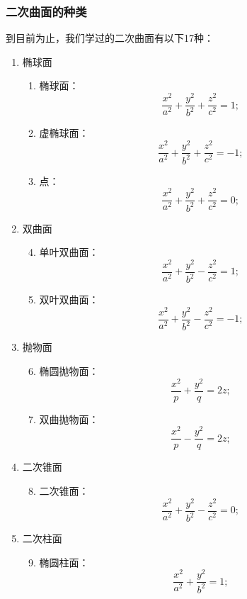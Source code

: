 \subsubsection{二次曲面的种类}
到目前为止，我们学过的二次曲面有以下17种：
\begin{enumerate}[label={\chinese*.}]
	\item 椭球面
	\begin{enumerate}[label={\arabic*.}]
		\item 椭球面：\[
			\frac{x^2}{a^2}+\frac{y^2}{b^2}+\frac{z^2}{c^2}=1;
		\]

		\item 虚椭球面：\[
			\frac{x^2}{a^2}+\frac{y^2}{b^2}+\frac{z^2}{c^2}=-1;
		\]

		\item 点：\[
			\frac{x^2}{a^2}+\frac{y^2}{b^2}+\frac{z^2}{c^2}=0;
		\]
	\end{enumerate}

	\item 双曲面
	\begin{enumerate}[label={\arabic*.}]
		\setcounter{enumii}{3}
		\item 单叶双曲面：\[
			\frac{x^2}{a^2}+\frac{y^2}{b^2}-\frac{z^2}{c^2}=1;
		\]

		\item 双叶双曲面：\[
			\frac{x^2}{a^2}+\frac{y^2}{b^2}-\frac{z^2}{c^2}=-1;
		\]
	\end{enumerate}

	\item 抛物面
	\begin{enumerate}[label={\arabic*.}]
		\setcounter{enumii}{5}
		\item 椭圆抛物面：\[
			\frac{x^2}{p}+\frac{y^2}{q}=2z;
		\]

		\item 双曲抛物面：\[
			\frac{x^2}{p}-\frac{y^2}{q}=2z;
		\]
	\end{enumerate}

	\item 二次锥面
	\begin{enumerate}[label={\arabic*.}]
		\setcounter{enumii}{7}
		\item 二次锥面：\[
			\frac{x^2}{a^2}+\frac{y^2}{b^2}-\frac{z^2}{c^2}=0;
		\]
	\end{enumerate}

	\item 二次柱面
	\begin{enumerate}[label={\arabic*.}]
		\setcounter{enumii}{8}
		\item 椭圆柱面：\[
			\frac{x^2}{a^2}+\frac{y^2}{b^2}=1;
		\]


\end{enumerate}
\end{enumerate}
